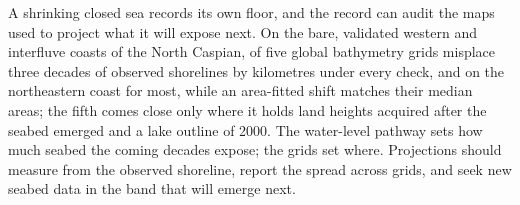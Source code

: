 
A shrinking closed sea records its own floor, and the record can audit the maps used to project what it will expose next. On the bare, validated western and interfluve coasts of the North Caspian,  of five global bathymetry grids misplace three decades of observed shorelines by kilometres under every check, and on the northeastern coast for most, while an area-fitted shift matches their median areas; the fifth comes close only where it holds land heights acquired after the seabed emerged and a lake outline of 2000. The water-level pathway sets how much seabed the coming decades expose; the grids set where. Projections should measure from the observed shoreline, report the spread across grids, and seek new seabed data in the band that will emerge next.
